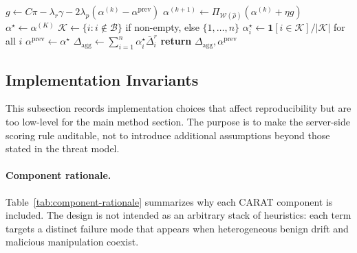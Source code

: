 \begin{algorithm}[t]
\begin{algorithmic}[1]
    \STATE $g \leftarrow C\pi - \lambda_r \gamma - 2\lambda_p(\alpha^{(k)}-\alpha^{\mathrm{prev}})$
    \STATE $\alpha^{(k+1)} \leftarrow \Pi_{\mathcal{W}(\hat{\rho})}\!\left(\alpha^{(k)}+\eta g\right)$
\ENDFOR
\STATE $\alpha^\star \leftarrow \alpha^{(K)}$
    \STATE $\mathcal{K} \leftarrow \{i : i\notin\mathcal{B}\}$ if non-empty, else $\{1,\dots,n\}$
    \STATE $\alpha_i^\star \leftarrow \mathbf{1}[i\in\mathcal{K}]/|\mathcal{K}|$ for all $i$ 
\ENDIF
\STATE $\alpha^{\mathrm{prev}} \leftarrow \alpha^\star$
\STATE $\Delta_{\mathrm{agg}} \leftarrow \sum_{i=1}^n \alpha_i^\star \bar{\Delta}_i^r$
\STATE \textbf{return} $\Delta_{\mathrm{agg}}, \alpha^{\mathrm{prev}}$
\end{algorithmic}
\end{algorithm}

\subsection{Implementation Invariants}
\label{sec:appendix-implementation}

This subsection records implementation choices that affect reproducibility but are too low-level for the main method section. The purpose is to make the server-side scoring rule auditable, not to introduce additional assumptions beyond those stated in the threat model.

\paragraph{Component rationale.}
\label{sec:appendix-component-rationale}
Table~\ref{tab:component-rationale} summarizes why each CARAT component is included. The design is not intended as an arbitrary stack of heuristics: each term targets a distinct failure mode that appears when heterogeneous benign drift and malicious manipulation coexist.

